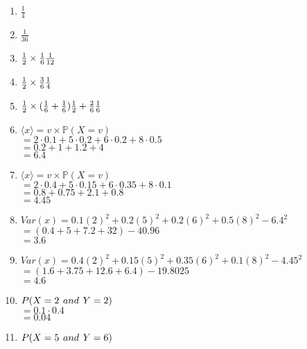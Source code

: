 \documentclass[a4paper]{article}
\begin{document}
    \begin{enumerate}[1.]
        \item $\frac{1}{4}$
        \item $\frac{1}{36}$
        \item $\frac{1}{2} \times \frac{1}{6} \\\\
        \frac{1}{12}$
        \item $\frac{1}{2} \times \frac{3}{6} \\\\
        \frac{1}{4}$
        \item $\frac{1}{2} \times (\frac{1}{6} + \frac{1}{6})\\\\
        \frac{1}{2} + \frac{2}{6}\\\\
        \frac{1}{6}$
        \item $\langle x \rangle = v \times \mathbb{P}(X = v)$\\
        $= 2 \cdot 0.1 + 5 \cdot 0.2 + 6 \cdot 0.2 + 8 \cdot 0.5$\\
        $= 0.2 + 1 + 1.2 + 4$\\
        $=6.4$
        \item $\langle x \rangle = v \times \mathbb{P}(X = v)$\\
        $=2 \cdot 0.4 + 5 \cdot 0.15 + 6 \cdot 0.35 + 8 \cdot 0.1$\\
        $= 0.8 + 0.75 + 2.1 + 0.8$\\
        $= 4.45$
        \item $Var(x) = 0.1(2)^2 + 0.2(5)^2 + 0.2(6)^2 + 0.5(8)^2 - 6.4^2$\\
        $=(0.4+5+7.2+32)-40.96$\\
        $=3.6$
        \item $Var(x) = 0.4(2)^2 + 0.15(5)^2 + 0.35(6)^2 + 0.1(8)^2 - 4.45^2$\\
        $= (1.6 + 3.75 + 12.6 + 6.4)-19.8025$\\
        $= 4.6$
        \item $P(X = 2 \hspace*{4px}and\hspace*{4px} Y = 2)$\\
        $= 0.1 \cdot 0.4$\\
        $= 0.04$
        \item $P(X = 5 \hspace*{4px}and\hspace*{4px} Y = 6)$\\

\end{enumerate}
\end{document}
